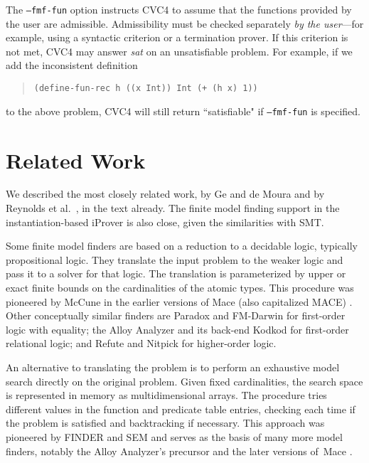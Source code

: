 \documentclass[runningheads,a4paper]{llncs}
\newcommand\cvc{CVC4\xspace}
\begin{document}
The \texttt{--fmf-fun} option instructs \cvc to assume that the
functions provided by the user are admissible.
Admissibility must be checked separately \emph{by the user}---for example, using a
syntactic criterion or a termination prover.
If this criterion is not met, \cvc may answer \emph{sat} on
an unsatisfiable problem. For example, if we add the inconsistent definition
%
\begin{quote}
\begin{verbatim}
(define-fun-rec h ((x Int)) Int (+ (h x) 1))
\end{verbatim}
\end{quote}
%
to the above problem, \cvc will still return ``satisfiable"
if \texttt{--fmf-fun} is specified.


\section{Related Work}

We described the most closely related work, by Ge and de Moura
\cite{GeDeM-CAV-09} and by Reynolds et al.\
\cite{ReyEtAl-1-RR-13,reynolds-et-al-2013}, in the text already.
The finite model finding support in the instantiation-based iProver
\cite{korovin-2013} is also close, given the similarities with SMT.


Some finite model finders are based on a reduction to a decidable logic,
typically propositional logic. They translate the input problem to the weaker
logic and pass it to a solver for that logic.
The translation is parameterized by upper or exact finite bounds on
the cardinalities of the atomic types. This procedure was pioneered by McCune
in the earlier versions of Mace (also capitalized MACE) \cite{mccune-1994}.
Other conceptually similar finders are Paradox \cite{claessen-sorensson-2003}
and FM-Darwin \cite{baumgartner-et-al-2009} for first-order logic with
equality; the Alloy Analyzer and its back-end Kodkod \cite{torlak-jackson-2007}
for first-order relational logic; and Refute \cite{weber-2008} and Nitpick
\cite{blanchette-nipkow-2010} for higher-order logic.

An alternative to translating the problem is to perform
an exhaustive model search directly on the original problem. Given fixed
cardinalities, the search space is represented in memory as multidimensional
arrays. The procedure tries different values in the function and predicate
table entries, checking each time if the problem is satisfied and backtracking
if necessary. This approach was pioneered by FINDER \cite{slaney-1994} and
SEM \cite{zhang-zhang-1995} and serves as the basis of many more model finders,
notably the Alloy Analyzer's precursor \cite{jackson-1996} and the later
versions of~Mace \cite{mccune-prover9-mace4}.
\end{document}
